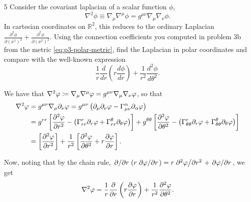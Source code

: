 \documentclass[11pt]{article}
\begin{document}
\begin{problem}{5}
	Consider the covariant laplacian of a scalar function \(\phi\),
	\begin{equation}
		\label{eq:p5-covariant-laplacian}
		\nabla^2\phi\equiv\nabla_\mu\nabla^\mu\phi=g^{\mu\nu}\nabla_\mu\nabla_\nu\phi.
	\end{equation}
	In cartesian coordinates on \(\mathbb{R}^2\), this reduces to the ordinary Laplacian \(\frac{\partial^2\phi}{\partial(x^1)^2}+\frac{\partial^2\phi}{\partial(x^2)^2}\).
	Using the connection coefficients you computed in problem 3b from the metric \cref{eq:p3-polar-metric}, find the Laplacian in polar coordinates and compare with the well-known expression
	\begin{equation}
		\label{eq:p5-polar-laplacian}
		\frac1r\frac{d}{dr}\left(r\frac{d\phi}{dr}\right)+\frac1{r^2}\frac{d^2\phi}{d\theta^2}.
	\end{equation}
\end{problem}
\begin{answer}
  We have that \( \laplacian{\varphi} \coloneq \nabla_{\mu}\nabla^{\mu} \varphi = g^{\mu\nu}\nabla_{\mu}\nabla_{\nu}\varphi\), so that
  \begin{equation}
  \label{eq:2}
  \begin{aligned}
    \laplacian{\varphi} &= g^{\mu\nu}\nabla_{\mu}\partial_{\nu}\varphi = g^{\mu\nu} \left( \partial_{\mu}\partial_{\nu}\varphi - \Gamma^{\alpha}_{\mu\nu}\partial_{\alpha}\varphi \right) \\
                  &= g^{rr} \left[ \pdv[2]{\varphi}{r} - \left( \Gamma_{rr}^r\partial_r\varphi + \Gamma_{rr}^{\theta}\partial_{\theta}\varphi \right) \right] + g^{\theta\theta} \left[ \pdv[2]{\varphi}{\theta} - \left( \Gamma_{\theta\theta}^r\partial_r\varphi + \Gamma_{\theta\theta}^{\theta}\partial_{\theta}\varphi \right) \right] \\
                  &= \left[ \pdv[2]{\varphi}{r} \right] + \frac{1}{r^2} \left[ \pdv[2]{\varphi}{\theta} + r\pdv{\varphi}{r} \right].
  \end{aligned}
\end{equation}

Now, noting that by the chain rule, \( \pdv*{r}(r\pdv*{\varphi}{r}) = r\pdv*[2]{\varphi}{r} + \pdv*{\varphi}{r}\), we get
\begin{equation}
\label{eq:14}
\nabla^2\varphi = \frac{1}{r}\pdv{r}\left( r\pdv{\varphi}{r} \right) + \frac{1}{r^2}\pdv[2]{\varphi}{\theta}.
\end{equation}
\end{answer}
\end{document}
